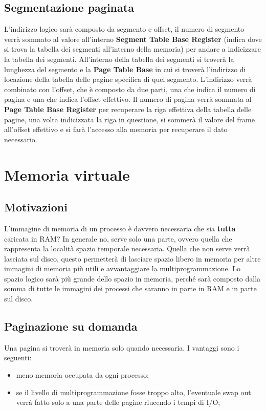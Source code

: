 \documentclass[a4paper, 12pt]{book}
\begin{document}
\section{Segmentazione paginata}

L'indirizzo logico sarà composto da segmento e offset, il numero di segmento verrà sommato al valore all'interno \textbf{Segment Table Base Register} (indica dove si trova la tabella dei segmenti all'interno della memoria) 
per andare a indicizzare la tabella dei segmenti. All'interno della tabella dei segmenti si troverà la lunghezza del segmento e 
la \textbf{Page Table Base} in cui si troverà l'indirizzo di locazione della tabella delle pagine specifica di quel segmento. 
L'indirizzo verrà combinato con l'offset, che è composto da due parti, una che indica il numero di pagina e una che indica 
l'offset effettivo. Il numero di pagina verrà sommata al \textbf{Page Table Base Register} per recuperare la riga effettiva della 
tabella delle pagine, una volta indicizzata la riga in questione, si sommerà il valore del frame all'offset effettivo e si farà 
l'accesso alla memoria per recuperare il dato necessario. 

\chapter{Memoria virtuale}

\section{Motivazioni}

L'immagine di memoria di un processo è davvero necessaria che sia \textbf{tutta} caricata in RAM? In generale no, serve solo una parte,
ovvero quella che rappresenta la località spazio temporale necessaria. Quella che non serve verrà lasciata sul disco, 
questo permetterà di lasciare spazio libero in memoria per altre immagini di memoria più utili e avvantaggiare la multiprogrammazione.
Lo spazio logico sarà più grande dello spazio in memoria, perché sarà composto dalla somma di tutte le immagini dei processi che 
saranno in parte in RAM e in parte sul disco. 

\section{Paginazione su domanda}

Una pagina si troverà in memoria solo quando necessaria. I vantaggi sono i seguenti:
\begin{itemize}
    \item meno memoria occupata da ogni processo;
    \item se il livello di multiprogrammazione fosse troppo alto, l'eventuale swap out verrà fatto solo a una parte delle pagine riucendo i tempi di I/O;
\end{itemize}
\end{document}
